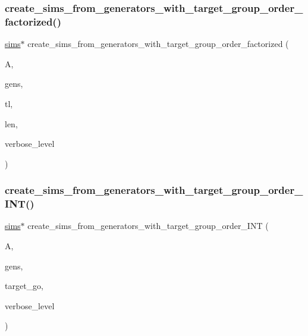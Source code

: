 \subsubsection{\texorpdfstring{create\+\_\+sims\+\_\+from\+\_\+generators\+\_\+with\+\_\+target\+\_\+group\+\_\+order\+\_\+factorized()}{create\_sims\_from\_generators\_with\_target\_group\_order\_factorized()}}
{\footnotesize\ttfamily \mbox{\hyperlink{classsims}{sims}}$\ast$ create\+\_\+sims\+\_\+from\+\_\+generators\+\_\+with\+\_\+target\+\_\+group\+\_\+order\+\_\+factorized (\begin{DoxyParamCaption}\item[{\mbox{\hyperlink{classaction}{action}} $\ast$}]{A,  }\item[{\mbox{\hyperlink{classvector__ge}{vector\+\_\+ge}} $\ast$}]{gens,  }\item[{\mbox{\hyperlink{galois_8h_a09fddde158a3a20bd2dcadb609de11dc}{I\+NT}} $\ast$}]{tl,  }\item[{\mbox{\hyperlink{galois_8h_a09fddde158a3a20bd2dcadb609de11dc}{I\+NT}}}]{len,  }\item[{\mbox{\hyperlink{galois_8h_a09fddde158a3a20bd2dcadb609de11dc}{I\+NT}}}]{verbose\+\_\+level }\end{DoxyParamCaption})}

\mbox{\label{sims__global_8_c_a4e7d0b5c218eb15f66a0714069168efb}} 
\subsubsection{\texorpdfstring{create\+\_\+sims\+\_\+from\+\_\+generators\+\_\+with\+\_\+target\+\_\+group\+\_\+order\+\_\+\+I\+N\+T()}{create\_sims\_from\_generators\_with\_target\_group\_order\_INT()}}
{\footnotesize\ttfamily \mbox{\hyperlink{classsims}{sims}}$\ast$ create\+\_\+sims\+\_\+from\+\_\+generators\+\_\+with\+\_\+target\+\_\+group\+\_\+order\+\_\+\+I\+NT (\begin{DoxyParamCaption}\item[{\mbox{\hyperlink{classaction}{action}} $\ast$}]{A,  }\item[{\mbox{\hyperlink{classvector__ge}{vector\+\_\+ge}} $\ast$}]{gens,  }\item[{\mbox{\hyperlink{galois_8h_a09fddde158a3a20bd2dcadb609de11dc}{I\+NT}}}]{target\+\_\+go,  }\item[{\mbox{\hyperlink{galois_8h_a09fddde158a3a20bd2dcadb609de11dc}{I\+NT}}}]{verbose\+\_\+level }\end{DoxyParamCaption})}

